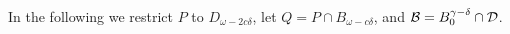 
In the following we restrict $P$ to $D_{\omega-2c\delta}$, let $Q = P\cap B_{\omega - c\delta}$, and ${\mathcal{B}} = B_0^{\gamma-\delta}\cap{\mathcal{D}}$.


